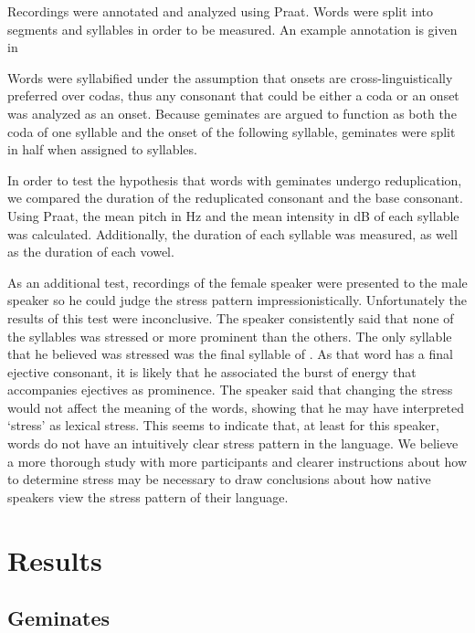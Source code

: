 \documentclass[12pt]{article}
\begin{document}
Recordings were annotated and analyzed using Praat. Words were split into segments and syllables in order to be measured. An example annotation is given in  



Words were syllabified under the assumption that onsets are cross-linguistically preferred over codas, thus any consonant that could be either a coda or an onset was analyzed as an onset. Because geminates are argued to function as both the coda of one syllable and the onset of the following syllable, geminates were split in half when assigned to syllables. 

In order to test the hypothesis that words with geminates undergo reduplication, we compared the duration of the reduplicated consonant and the base consonant. Using Praat, the mean pitch in Hz and the mean intensity in dB of each syllable was calculated. Additionally, the duration of each syllable was measured, as well as the duration of each vowel. 

As an additional test, recordings of the female speaker were presented to the male speaker so he could judge the stress pattern impressionistically. Unfortunately the results of this test were inconclusive. The speaker consistently said that none of the syllables was stressed or more prominent than the others. The only syllable that he believed was stressed was the final syllable of \emph{}. As that word has a final ejective consonant, it is likely that he associated the burst of energy that accompanies ejectives as prominence. The speaker said that changing the stress would not affect the meaning of the words, showing that he may have interpreted `stress' as lexical stress. This seems to indicate that, at least for this speaker, words do not have an intuitively clear stress pattern in the language. We believe a more thorough study with more participants and clearer instructions about how to determine stress may be necessary to draw conclusions about how native speakers view the stress pattern of their language. 

\section{Results}
\subsection{Geminates}
\end{document}
